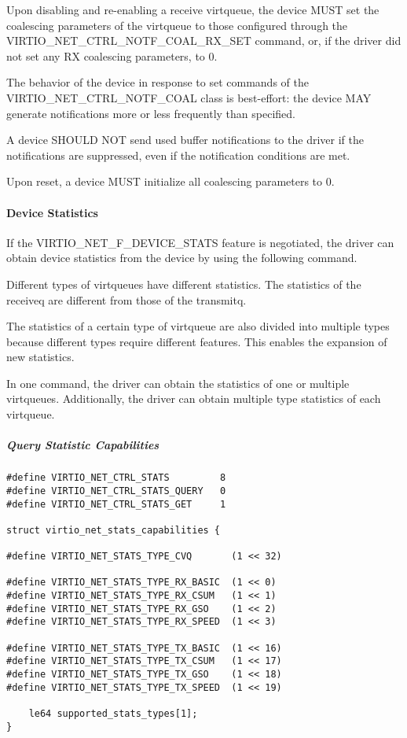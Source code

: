 Upon disabling and re-enabling a receive virtqueue, the device MUST set the coalescing parameters of the virtqueue
to those configured through the VIRTIO_NET_CTRL_NOTF_COAL_RX_SET command, or, if the driver did not set any RX coalescing parameters, to 0.

The behavior of the device in response to set commands of the VIRTIO_NET_CTRL_NOTF_COAL class is best-effort:
the device MAY generate notifications more or less frequently than specified.

A device SHOULD NOT send used buffer notifications to the driver if the notifications are suppressed, even if the notification conditions are met.

Upon reset, a device MUST initialize all coalescing parameters to 0.

\paragraph{Device Statistics}\label{sec:Device Types / Network Device / Device Operation / Control Virtqueue / Device Statistics}

If the VIRTIO_NET_F_DEVICE_STATS feature is negotiated, the driver can obtain
device statistics from the device by using the following command.

Different types of virtqueues have different statistics. The statistics of the
receiveq are different from those of the transmitq.

The statistics of a certain type of virtqueue are also divided into multiple types
because different types require different features. This enables the expansion
of new statistics.

In one command, the driver can obtain the statistics of one or multiple virtqueues.
Additionally, the driver can obtain multiple type statistics of each virtqueue.

\subparagraph{Query Statistic Capabilities}\label{sec:Device Types / Network Device / Device Operation / Control Virtqueue / Device Statistics / Query Statistic Capabilities}

\begin{lstlisting}
#define VIRTIO_NET_CTRL_STATS         8
#define VIRTIO_NET_CTRL_STATS_QUERY   0
#define VIRTIO_NET_CTRL_STATS_GET     1

struct virtio_net_stats_capabilities {

#define VIRTIO_NET_STATS_TYPE_CVQ       (1 << 32)

#define VIRTIO_NET_STATS_TYPE_RX_BASIC  (1 << 0)
#define VIRTIO_NET_STATS_TYPE_RX_CSUM   (1 << 1)
#define VIRTIO_NET_STATS_TYPE_RX_GSO    (1 << 2)
#define VIRTIO_NET_STATS_TYPE_RX_SPEED  (1 << 3)

#define VIRTIO_NET_STATS_TYPE_TX_BASIC  (1 << 16)
#define VIRTIO_NET_STATS_TYPE_TX_CSUM   (1 << 17)
#define VIRTIO_NET_STATS_TYPE_TX_GSO    (1 << 18)
#define VIRTIO_NET_STATS_TYPE_TX_SPEED  (1 << 19)

    le64 supported_stats_types[1];
}
\end{lstlisting}

